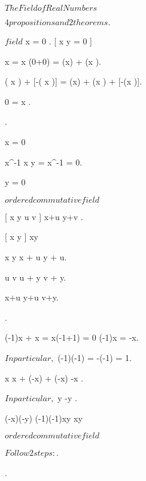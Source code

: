 \unit{ $The Field of Real Numbers$ }
{
 	\introduction
	{
 		$
 			4 propositions and 2 theorems.
 		$
 	}

	{
 	{
 		\K $ field $
 	}
 	\holds
 	{
 		{
 			x = 0
 		}.
 		[ x \cdot y = 0 ]
 		{
 		}
 	}
 	\demonstration
 	{
 		x  = x \cdot (0+0) = (x) + (x ).

 		( x  ) + [-( x  )] = (x) + (x ) + [-(x )].

 		0 = x .

 		.

 		{
 			x = 0
 		}
 		{
 			x^{-1} \cdot x \cdot y = x^{-1} \cdot 0 = 0.

 			y = 0
 		}

 	}
	}



	{
	{
		\K $ ordered commutative field $
	}
	\holds
	{
		[ x \leq y \logicand u \leq v  ]
		{
			x+u \leq y+v
		}.

		[ x  \logicand y  ]
		{
			xy 
		}
	}
	\demonstration
	{
		x \leq y \imp x + u \leq y + u.

		u \leq v \imp u + y \leq v + y.

		\conclude x+u \leq y+u \leq v+y.

		.

		(-1)x + x = x(-1+1) = 0 \imp (-1)x = -x.

		$ In particular, $ (-1)(-1) = -(-1) = 1.

		x  \imp x + (-x)  + (-x) \imp -x .

		$ In particular, $ y  \imp -y .

		 \imp (-x)(-y)  \imp (-1)(-1)xy  \imp xy  
	}
	}



	{
	{
		\K $ ordered commutative field $
	}
	\holds
	{
	}
	\demonstration
	{
		$ Follow 2 steps: $.
			
		{
			.

}}}}
